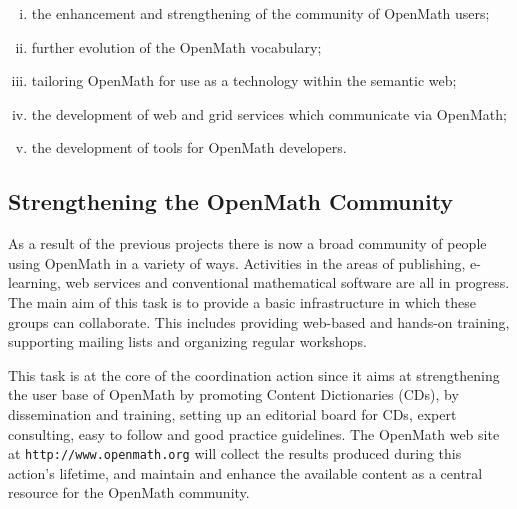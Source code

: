 \documentclass{euproposal}
\begin{document}
\begin{enumerate}[(i)]
\item the enhancement and strengthening of the community of OpenMath
  users;
\item further evolution of the OpenMath vocabulary;
\item tailoring OpenMath for use as a technology within the semantic
  web;
\item the development of web and grid services which communicate via
  OpenMath;
\item the development of tools for OpenMath developers.
\end{enumerate}


\subsection{Strengthening the OpenMath Community}\label{community}


As a result of the previous projects there is now a broad community of
people using OpenMath in a variety of ways.  Activities in the areas
of publishing, e-learning, web services and conventional mathematical
software are all in progress.  The main aim of this task is to provide
a basic infrastructure in which these groups can collaborate. This
includes providing web-based and hands-on training, supporting mailing
lists and organizing regular workshops.

This task is at the core of the coordination action since it aims at
strengthening the user base of OpenMath by promoting Content
Dictionaries (CDs), by dissemination and training, setting up an editorial
board for CDs, expert consulting, easy to follow and good practice
guidelines. The OpenMath web site at \texttt{http://www.openmath.org}
will collect the results produced during this action's lifetime, and
maintain and enhance the available content as a central resource for
the OpenMath community. 


\end{document}
